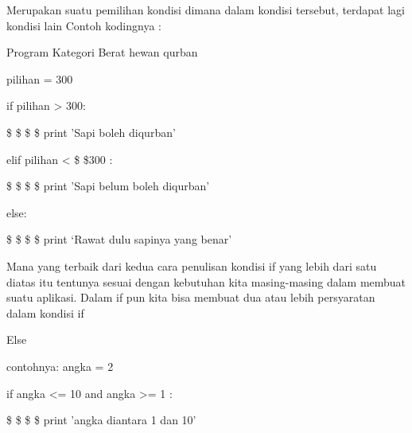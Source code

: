\vspace{\baselineskip}
Merupakan suatu pemilihan kondisi dimana dalam kondisi tersebut, terdapat lagi kondisi lain\vspace{\baselineskip}
Contoh kodingnya : \par
\noindent 
\vspace{\baselineskip}
Program Kategori Berat hewan qurban \par
\noindent 
\vspace{\baselineskip}
pilihan = 300 \par
\noindent 
\vspace{\baselineskip}
if pilihan > 300: \par
\noindent 
\vspace{\baselineskip}
 \$  \$  \$  \$ print 'Sapi boleh diqurban' \par
\noindent 
\vspace{\baselineskip}
elif pilihan <  \$  \$300 : \par
\noindent 
\vspace{\baselineskip}
 \$  \$  \$  \$ print 'Sapi belum boleh diqurban' \par
\noindent 
\vspace{\baselineskip}
else: \par
\noindent 
\vspace{\baselineskip}
 \$  \$  \$  \$ print ‘Rawat dulu sapinya yang benar' \par
\noindent 
\vspace{\baselineskip}
Mana yang terbaik dari kedua cara penulisan kondisi if yang lebih dari satu diatas itu tentunya sesuai dengan kebutuhan kita masing-masing dalam membuat suatu aplikasi. Dalam if pun kita bisa membuat dua atau lebih persyaratan dalam kondisi if \par
\noindent 
\vspace{\baselineskip}
\vspace{\baselineskip}
Else \par
\noindent 
\vspace{\baselineskip}
contohnya:\vspace{\baselineskip}
angka = 2 \par
\noindent 
\vspace{\baselineskip}
if angka <= 10 and angka >= 1 : \par
\noindent 
\vspace{\baselineskip}
 \$  \$  \$  \$ print 'angka diantara 1 dan 10' \par
\noindent 
\vspace{\baselineskip}
